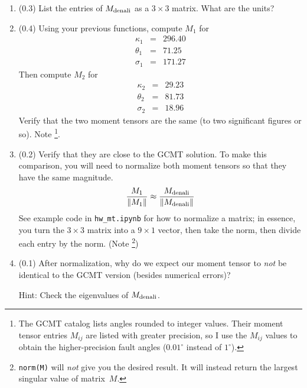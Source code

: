 \documentclass[11pt,titlepage,fleqn]{article}
\newcommand{\Mmat}{M}
\begin{document}
\begin{enumerate}
\begin{enumerate}
\item (0.3) List the entries of $\Mmat_{\rm denali}$ as a $3 \times 3$ matrix. What are the units?

\item (0.4) Using your previous functions, compute $\Mmat_1$ for 
%
\begin{eqnarray*}
\kappa_1 &=& 296.40
\\
\theta_1 &=& 71.25
\\
\sigma_1 &=& 171.27
\end{eqnarray*}
%
Then compute $\Mmat_2$ for
%
\begin{eqnarray*}
\kappa_2 &=& 29.23
\\
\theta_2 &=& 81.73
\\
\sigma_2 &=& 18.96
\end{eqnarray*}
%
 Verify that the two moment tensors are the same (to two significant figures or so). Note \footnote{The GCMT catalog lists angles rounded to integer values. Their moment tensor entries $M_{ij}$ are listed with greater precision, so I use the $M_{ij}$ values to obtain the higher-precision fault angles ($0.01^\circ$ instead of $1^\circ$).}.

\item (0.2) Verify that they are close to the GCMT solution. To make this comparison, you will need to normalize both moment tensors so that they have the same magnitude.
%
\begin{equation}
\frac{\Mmat_1}{\|\Mmat_1\|} \approx \frac{\Mmat_{\rm denali} }{\|\Mmat_{\rm denali}\|}
\end{equation}
%
See example code in \verb+hw_mt.ipynb+ for how to normalize a matrix; in essence, you turn the $3 \times 3$ matrix into a $9 \times 1$ vector, then take the norm, then divide each entry by the norm. (Note \footnote{{\tt norm(M)} will {\em not} give you the desired result. It will instead return the largest singular value of matrix~$\Mmat$.})

\item (0.1) After normalization, why do we expect our moment tensor to {\em not} be identical to the GCMT version (besides numerical errors)?

Hint: Check the eigenvalues of $\Mmat_{\rm denali}$.


\end{enumerate}

\end{enumerate}
\end{document}
